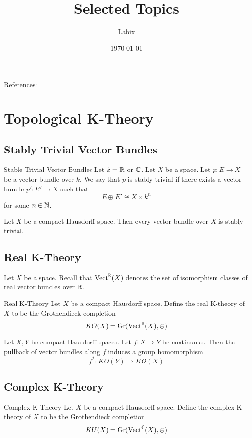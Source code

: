 \documentclass[a4paper]{article}
\title{Selected Topics}
\author{Labix}
\date{\today}
\begin{document}
\maketitle
\begin{abstract}
\end{abstract}

References: 
\pagebreak
\tableofcontents

\pagebreak
\section{Topological K-Theory}
\subsection{Stably Trivial Vector Bundles}
\begin{defn}{Stable Trivial Vector Bundles}{} Let $k=\mathbb{R}$ or $\mathbb{C}$. Let $X$ be a space. Let $p:E\to X$ be a vector bundle over $k$. We say that $p$ is stably trivial if there exists a vector bundle $p':E'\to X$ such that $$E\oplus E'\cong X\times k^n$$ for some $n\in\mathbb{N}$. 
\end{defn}

\begin{prp}{}{} Let $X$ be a compact Hausdorff space. Then every vector bundle over $X$ is stably trivial. 
\end{prp}

\subsection{Real K-Theory}
Let $X$ be a space. Recall that $\text{Vect}^{\mathbb{R}}(X)$ denotes the set of isomorphism classes of real vector bundles over $\mathbb{R}$. 

\begin{defn}{Real K-Theory}{} Let $X$ be a compact Hausdorff space. Define the real K-theory of $X$ to be the Grothendieck completion $$KO(X)=\text{Gr}(\text{Vect}^{\mathbb{R}}(X),\oplus)$$
\end{defn}

\begin{prp}{}{} Let $X,Y$ be compact Hausdorff spaces. Let $f:X\to Y$ be continuous. Then the pullback of vector bundles along $f$ induces a group homomorphism $$f^\ast:KO(Y)\to KO(X)$$
\end{prp}

\subsection{Complex K-Theory}
\begin{defn}{Complex K-Theory}{} Let $X$ be a compact Hausdorff space. Define the complex K-theory of $X$ to be the Grothendieck completion $$KU(X)=\text{Gr}(\text{Vect}^{\mathbb{C}}(X),\oplus)$$
\end{defn}
\end{document}

